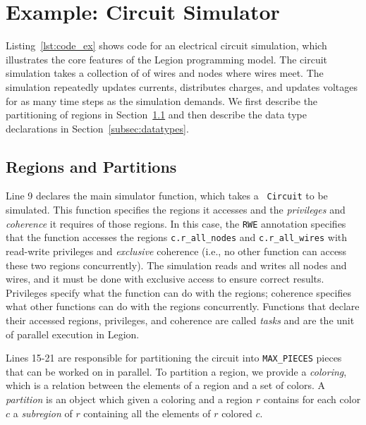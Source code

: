 \section{Example: Circuit Simulator}
\label{sec:ex}

Listing~\ref{lst:code_ex} shows code for an electrical
circuit simulation, which illustrates the core features of the Legion programming model.
The circuit simulation takes a collection of
of wires and nodes where wires meet.  
The simulation repeatedly updates
currents, distributes charges, and updates voltages for as many
time steps as the simulation demands.  We first
describe the partitioning of regions in Section~\ref{subsec:partitioning}
and then describe the data type declarations in Section~\ref{subsec:datatypes}.

\subsection{Regions and Partitions}
\label{subsec:partitioning}

Line 9 declares the main simulator function, which takes a {\tt
Circuit} to be simulated.  This function specifies the regions it 
accesses and the {\em privileges} and {\em coherence} it requires of those regions.
In this case, the {\tt RWE} annotation specifies that the function
accesses the regions {\tt c.r\_all\_nodes} and {\tt c.r\_all\_wires}
with read-write privileges and {\em exclusive} coherence (i.e., no other
function can access these two regions concurrently).  The simulation 
reads and writes all nodes and wires, and it must be done
with exclusive access to ensure correct results.  Privileges specify what
the function can do with the regions; coherence specifies what other
functions can do with the regions concurrently.  Functions that
declare their accessed regions, privileges, and coherence are called {\em tasks}
and are the unit of parallel execution in Legion.

Lines 15-21 are responsible for partitioning the circuit into {\tt MAX\_PIECES}
pieces that can be worked on in parallel.  To partition a region, we
provide a {\em coloring}, which is a relation between the elements
of a region and a set of colors.  A {\em partition} is an object which given
a coloring and a region $r$ contains for each color $c$ a {\em subregion} of $r$
containing all the elements of $r$ colored $c$.

